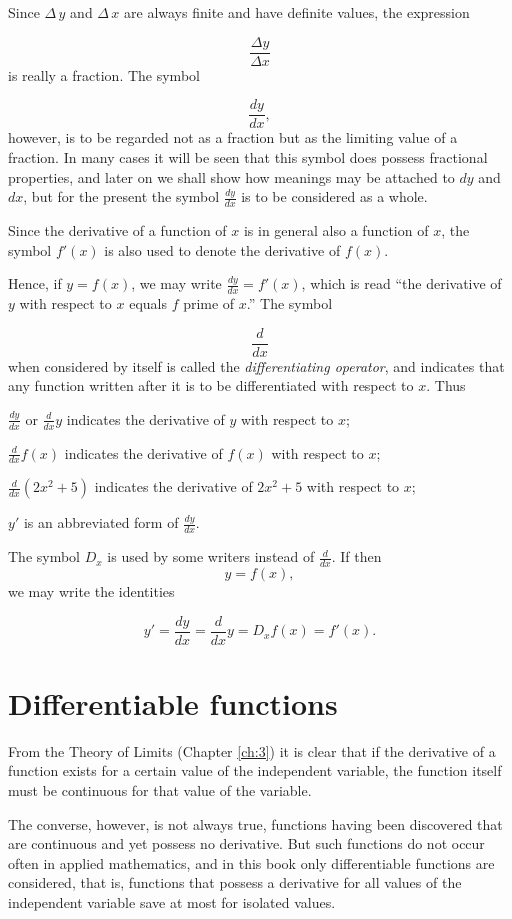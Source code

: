 Since $\Delta\, y$ and $\Delta\, x$ are always finite and have 
definite values, the expression

\[
    \frac{\Delta y}{\Delta x}
\]
is really a fraction. The symbol

\[
    \frac{dy}{dx},
\]
however, is to be regarded not as a fraction but as the limiting value 
of a fraction. In many cases it will be seen that this symbol does 
possess fractional properties, and later on we shall show how meanings 
may be attached to $dy$ and $dx$, but for the present the symbol $\frac{dy}{dx}$ 
is to be considered as a whole.

Since the derivative of a function of $x$ is in general also a function of $x$, 
the symbol $f'(x)$ is also used to denote the derivative of $f(x)$.

Hence, if $y 	= f(x)$,
we may write $\frac{dy}{dx} = f'(x)$,
which is read ``the derivative of $y$ with respect to $x$ equals $f$ prime of $x$.'' 
The symbol

\[
    \frac{d}{dx}
\]
when considered by itself is called the {\it differentiating operator}, 
and indicates that any function written after it is to be differentiated with 
respect to $x$. 
Thus

\qquad   $ \frac{dy}{dx}$ or $\frac{d}{dx} y$ indicates the derivative of $y$ with respect to $x$;

\qquad  $ \frac{d}{dx} f(x)$ indicates the derivative of $f(x)$ with respect to $x$;

\qquad $\frac{d}{dx} (2x^2 + 5)$ indicates the derivative of $2x^2 + 5$ with respect to $x$;

\qquad $ y'$ is an abbreviated form of $\frac{dy}{dx}$.

 
The symbol $D_x$ is used by some writers instead of $\frac{d}{dx}$. If then
\[
   y = f(x),
\]
we may write the identities

\[
    y' = \frac{dy}{dx} = \frac{d}{dx} y = D_x f(x) = f'(x).
\]


\section{Differentiable functions}

From the Theory of Limits 
(Chapter \ref{ch:3}) %
it is clear that if the derivative of a 
function exists for a certain value of the independent variable, the 
function itself must be continuous for that value of the variable.

The converse, however, is not always true, functions having been 
discovered that are continuous and yet possess no derivative. But such 
functions do not occur often in applied mathematics, and in this book only 
differentiable functions are considered, that is, functions that possess a 
derivative for all values of the independent variable save at most for isolated values.

